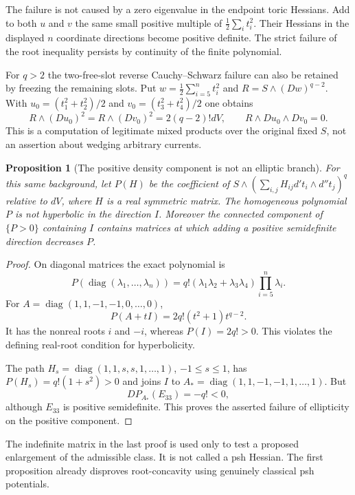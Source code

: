 \documentclass[11pt,a4paper]{article}
\numberwithin{equation}{section}
\newtheorem{proposition}[theorem]{Proposition}
\theoremstyle{definition}
\theoremstyle{remark}
\begin{document}
The failure is not caused by a zero eigenvalue in the endpoint toric
Hessians. Add to both $u$ and $v$ the same small positive multiple of
$\frac12\sum_i t_i^2$. Their Hessians in the displayed $n$ coordinate
directions become positive definite. The strict failure of the root
inequality persists by continuity of the finite polynomial.

For $q>2$ the two-free-slot reverse Cauchy--Schwarz failure can also
be retained by freezing the remaining slots. Put
$w=\frac12\sum_{i=5}^nt_i^2$ and
$R=S\wedge(Dw)^{q-2}$. With
$u_0=(t_1^2+t_2^2)/2$ and $v_0=(t_3^2+t_4^2)/2$ one obtains
\[
 R\wedge(Du_0)^2=R\wedge(Dv_0)^2=2(q-2)!dV,
                 \qquad R\wedge Du_0\wedge Dv_0=0.
\]
This is a computation of legitimate mixed products over the original
fixed $S$, not an assertion about wedging arbitrary currents.

\begin{proposition}[The positive density component is not an elliptic branch]
\label{prop:r6-relative-hyperbolicity-false}
For this same background, let $P(H)$ be the coefficient of
$S\wedge(\sum_{i,j}H_{ij}d't_i\wedge d''t_j)^q$ relative to $dV$,
where $H$ is a real symmetric matrix. The homogeneous polynomial $P$
is not hyperbolic in the direction $I$. Moreover the connected
component of $\{P>0\}$ containing $I$ contains matrices at which
adding a positive semidefinite direction decreases $P$.
\end{proposition}

\begin{proof}
On diagonal matrices the exact polynomial is
\[
 P(\operatorname{diag}(\lambda_1,\ldots,\lambda_n))
        =q!(\lambda_1\lambda_2+\lambda_3\lambda_4)
                                          \prod_{i=5}^n\lambda_i.
\]
For $A=\operatorname{diag}(1,1,-1,-1,0,\ldots,0)$,
\[
                         P(A+tI)=2q!(t^2+1)t^{q-2}.
\]
It has the nonreal roots $i$ and $-i$, whereas $P(I)=2q!>0$.
This violates the defining real-root condition for hyperbolicity.

The path
$H_s=\operatorname{diag}(1,1,s,s,1,\ldots,1)$,
$-1\le s\le1$, has $P(H_s)=q!(1+s^2)>0$ and joins $I$ to
$A_*=\operatorname{diag}(1,1,-1,-1,1,\ldots,1)$.
But
\[
                     DP_{A_*}(E_{33})=-q!<0,
\]
although $E_{33}$ is positive semidefinite. This proves the asserted
failure of ellipticity on the positive component.
\end{proof}

The indefinite matrix in the last proof is used only to test a proposed
enlargement of the admissible class. It is not called a psh Hessian.
The first proposition already disproves root-concavity using genuinely
classical psh potentials.
\end{document}
